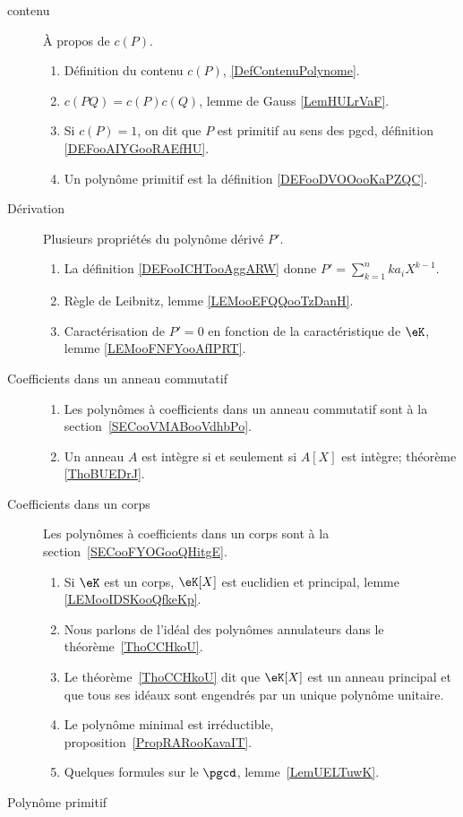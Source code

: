 \begin{description}
	\item[contenu]
		À propos de \( c(P)\).
		\begin{enumerate}
			\item Définition du contenu \( c(P)\), \ref{DefContenuPolynome}.
			\item
			      \( c(PQ)=c(P)c(Q)\), lemme de Gauss \ref{LemHULrVaF}.
			\item
			      Si \( c(P)=1\), on dit que \( P\) est primitif au sens des pgcd, définition \ref{DEFooAIYGooRAEfHU}.
			\item
			      Un polynôme primitif est la définition \ref{DEFooDVOOooKaPZQC}.
		\end{enumerate}

	\item[Dérivation]
		Plusieurs propriétés du polynôme dérivé \( P'\).
		\begin{enumerate}
			\item
			      La définition \ref{DEFooICHTooAggARW} donne \( P'=\sum_{k=1}^nka_iX^{k-1}\).
			\item
			      Règle de Leibnitz, lemme \ref{LEMooEFQQooTzDanH}.
			\item
			      Caractérisation de \( P'=0\) en fonction de la caractéristique de \( \eK\), lemme \ref{LEMooFNFYooAfIPRT}.
		\end{enumerate}

	\item[Coefficients dans un anneau commutatif]

		\begin{enumerate}
			\item
			      Les polynômes à coefficients dans un anneau commutatif  sont à la section~\ref{SECooVMABooVdhbPo}.
			\item
			      Un anneau \( A\) est intègre si et seulement si \( A[X]\) est intègre; théorème \ref{ThoBUEDrJ}.
		\end{enumerate}


	\item[Coefficients dans un corps]
		Les polynômes à coefficients dans un corps sont à la section~\ref{SECooFYOGooQHitgE}.
		\begin{enumerate}
			\item
			      Si \( \eK\) est un corps, \( \eK[X]\) est euclidien et principal, lemme \ref{LEMooIDSKooQfkeKp}.
			\item
			      Nous parlons de l'idéal des polynômes annulateurs dans le théorème~\ref{ThoCCHkoU}.
			\item
			      Le théorème~\ref{ThoCCHkoU} dit que \( \eK[X]\) est un anneau principal et que tous ses idéaux sont engendrés par un unique polynôme unitaire.
			\item
			      Le polynôme minimal est irréductible, proposition~\ref{PropRARooKavaIT}.
			\item
			      Quelques formules sur le \( \pgcd\), lemme~\ref{LemUELTuwK}.
		\end{enumerate}
	\item[Polynôme primitif]


\end{description}
